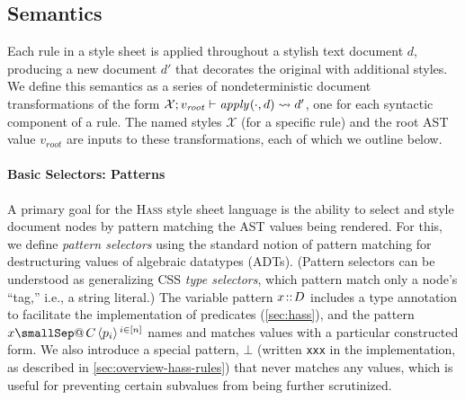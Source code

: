\documentclass[acmsmall, screen]{acmart}
\makeatletter
\newcommand{\parahead}[1]
  {\paragraph{\textbf{#1}}}
\newcommand{\hass}
{\textsc{Hass}}
\newcommand{\varDataCon}{C}
\newcommand{\varPat}{p}
\newcommand{\varTypeCon}{D}
\newcommand{\varDoc}{d}
\newcommand{\varVal}{v}
\newcommand{\varNamedStyles}
{\mathcal{X}}
\newcommand{\smallSep}
  {\hspace{0.02in}}
\newcommand{\dataApp}[2]{#1\smallSep#2}
\newcommand{\valRoot}{\varVal_{\mathit{root}}}
\newcommand{\namedPattern}[2]{#1\smallSep@\smallSep#2}
\newcommand{\hasType}[2]{#1\!::\!#2}
\newcommand{\keepOut}
{\bot}
\newcommand{\varPattern}[2]{\hasType{#1}{#2}}
\newcommand{\rangeN}[3]
{\langle#3\rangle\smallSep^{#1 \in [#2]}}
\newcommand{\applyTwo}[3]{\ensuremath{\mathit{apply}_{#1}(\hspace{-0.005in}#2,#3)}}
\newcommand{\applyEquals}[3]{\applyTwo{}{#1}{#2}\rightsquigarrow{#3}}
\makeatother
\begin{document}
\subsection{Semantics}
\label{sec:style-sheet-semantics}

\newcommand{\notHiddenArgs}[1]{\ensuremath{#1\vdash}}
\newcommand{\notHiddenArgsTwo}[2]{\ensuremath{#1;#2\vdash}}











Each rule in a style sheet is applied throughout a stylish text document $\varDoc$, producing a new document $\varDoc'$ that decorates the original with additional styles.
We define this semantics as a series of nondeterministic document transformations of the form
$
\notHiddenArgsTwo{\varNamedStyles}{\valRoot}\applyEquals{\cdot}{\varDoc}{\varDoc'}
$,
one for each syntactic component of a rule.
The named styles $\varNamedStyles$ (for a specific rule) and the root AST value $\valRoot$ are inputs to these transformations,
each of which we outline below.




\parahead{Basic Selectors: Patterns}

A primary goal for the \hass{} style sheet language is the ability to select and style document nodes by pattern matching the AST values being rendered.
For this, we define \emph{pattern selectors} using
the standard notion of pattern matching for destructuring values of algebraic datatypes (ADTs).
(Pattern selectors can be understood as generalizing CSS \emph{type selectors}, which pattern match only a node's ``tag,'' i.e., a string literal.)
The variable pattern $\varPattern{\varVar}{\varTypeCon}$ includes a type annotation to facilitate the implementation of predicates (\autoref{sec:hass}), and
the pattern $\namedPattern{\varVar}{\dataApp{\varDataCon}{\rangeN{i}{n}{\varPat_i}}}$ names and matches values with a particular constructed form.
We also introduce a special pattern, $\keepOut$ (written \texttt{xxx} in the implementation, as described in \autoref{sec:overview-hass-rules}) that never matches any values, which is useful for preventing certain subvalues from being further scrutinized.
\end{document}
